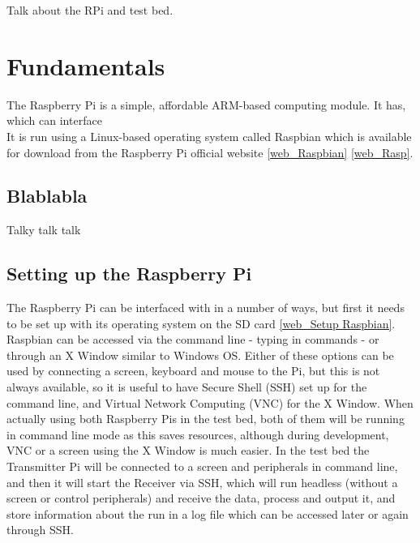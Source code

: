 \documentclass[../main.tex]{subfiles}
\begin{document}
Talk about the RPi and test bed.


\section{Fundamentals}

The Raspberry Pi is a simple, affordable ARM-based computing module. It has, which can interface\\

It is run using a Linux-based operating system called Raspbian which is available for download from the Raspberry Pi official website \ref{web_Raspbian} \ref{web_Rasp}.\\

\subsection{Blablabla}
Talky talk talk

\subsection{Setting up the Raspberry Pi}

The Raspberry Pi can be interfaced with in a number of ways, but first it needs to be set up with its operating system on the SD card \ref{web_Setup Raspbian}.
Raspbian can be accessed via the command line - typing in commands - or through an X Window similar to Windows OS.
Either of these options can be used by connecting a screen, keyboard and mouse to the Pi, but this is not always available, so it is useful to have Secure Shell (SSH) set up for the command line, and Virtual Network Computing (VNC) for the X Window.
When actually using both Raspberry Pis in the test bed, both of them will be running in command line mode as this saves resources, although during development, VNC or a screen using the X Window is much easier.
In the test bed the Transmitter Pi will be connected to a screen and peripherals in command line, and then it will start the Receiver via SSH, which will run headless (without a screen or control peripherals) and receive the data, process and output it, and store information about the run in a log file which can be accessed later or again through SSH.\\
\end{document}
